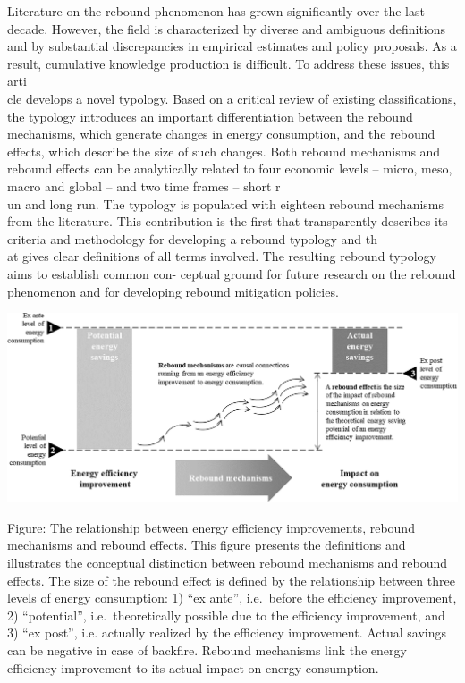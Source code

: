\documentclass[
]{book}
\begin{document}
Literature on the rebound phenomenon has grown significantly over the last decade. However, the field is
characterized by diverse and ambiguous definitions and by substantial discrepancies in empirical estimates and
policy proposals. As a result, cumulative knowledge production is difficult. To address these issues, this arti\\
cle
develops a novel typology. Based on a critical review of existing classifications, the typology introduces an
important differentiation between the rebound mechanisms, which generate changes in energy consumption, and
the rebound effects, which describe the size of such changes. Both rebound mechanisms and rebound effects can
be analytically related to four economic levels -- micro, meso, macro and global -- and two time frames -- short r\\
un
and long run. The typology is populated with eighteen rebound mechanisms from the literature. This contribution
is the first that transparently describes its criteria and methodology for developing a rebound typology and th\\
at
gives clear definitions of all terms involved. The resulting rebound typology aims to establish common con-
ceptual ground for future research on the rebound phenomenon and for developing rebound mitigation policies.

\includegraphics{fig/lange_rebound.png}

Figure: The relationship between energy efficiency improvements, rebound mechanisms and rebound effects. This figure presents the definitions and illustrates the
conceptual distinction between rebound mechanisms and rebound effects. The size of the rebound effect is defined by the relationship between three levels of energy
consumption: 1) ``ex ante'', i.e.~before the efficiency improvement, 2) ``potential'', i.e.~theoretically possible due to the efficiency improvement, and 3) ``ex post'', i.e.
actually realized by the efficiency improvement. Actual savings can be negative in case of backfire. Rebound mechanisms link the energy efficiency improvement to
its actual impact on energy consumption.
\end{document}

